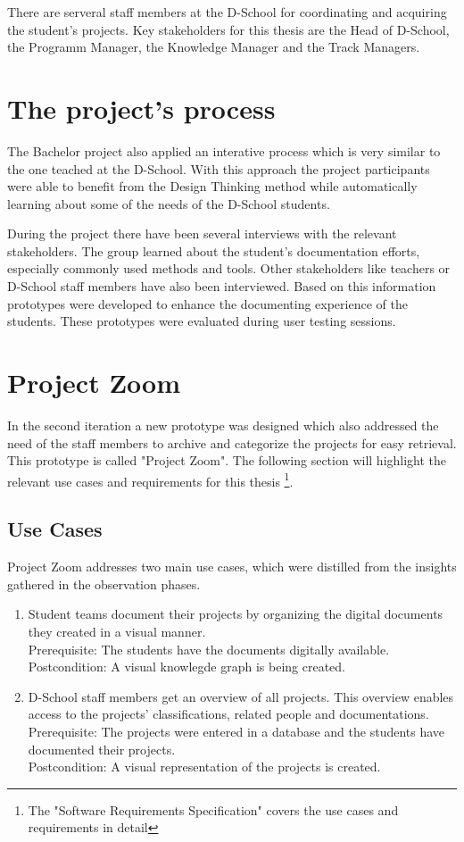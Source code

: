There are serveral staff members at the D-School for coordinating and acquiring the student's projects. Key stakeholders for this thesis are the Head of D-School, the Programm Manager, the Knowledge Manager and the Track Managers.

\section{The project's process}
The Bachelor project also applied an interative process which is very similar to the one teached at the D-School. With this approach the project participants were able to benefit from the Design Thinking method while automatically learning about some of the needs of the D-School students.

During the project there have been several interviews with the relevant stakeholders. The group learned about the student's documentation efforts, especially commonly used methods and tools. Other stakeholders like teachers or D-School staff members have also been interviewed. Based on this information prototypes were developed to enhance the documenting experience of the students. These prototypes were evaluated during user testing sessions.

\section{Project Zoom}
In the second iteration a new prototype was designed which also addressed the need of the staff members to archive and categorize the projects for easy retrieval. This prototype is called "Project Zoom". The following section will highlight the relevant use cases and requirements for this thesis \footnote{The "Software Requirements Specification"\cite{ReqSpec} covers the use cases and requirements in detail}.

\subsection{Use Cases}
Project Zoom addresses two main use cases, which were distilled from the insights gathered in the observation phases.

\begin{enumerate}
\item Student teams document their projects by organizing the digital documents they created in a visual manner.\\
Prerequisite: The students have the documents digitally available.\\
Postcondition: A visual knowlegde graph is being created.

\item D-School staff members get an overview of all projects. This overview enables access to the projects' classifications, related people and documentations.\\
Prerequisite: The projects were entered in a database and the students have documented their projects.\\
Postcondition: A visual representation of the projects is created.

\end{enumerate}


